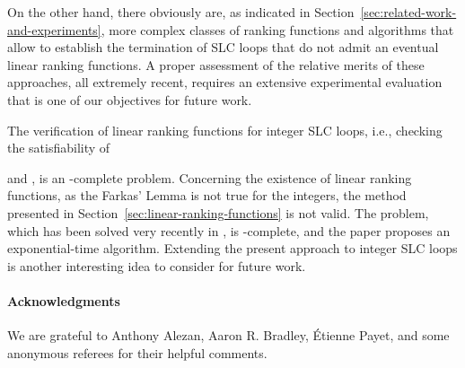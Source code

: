 \documentclass{acm_proc_article-sp}
\begin{document}
On the other hand, there obviously are, as indicated
in Section~\ref{sec:related-work-and-experiments},
more complex classes of ranking functions and algorithms that allow
to establish the termination of SLC loops that do not admit an
eventual linear ranking functions.
A proper assessment of the relative merits of these approaches,
all extremely recent, requires an extensive experimental evaluation
that is one of our objectives for future work.

The verification of linear ranking functions for integer SLC loops, i.e.,
checking the satisfiability of

and ,
is an -complete problem.
Concerning the existence of linear ranking functions,
as the Farkas' Lemma is not true for the integers,
the method presented in Section~\ref{sec:linear-ranking-functions} is not
valid.
The problem, which has been solved very recently in \cite{Ben-AmramG13},
is -complete, and the paper proposes an exponential-time algorithm.
Extending the present approach to integer SLC loops is another
interesting idea to consider for future work.

\paragraph{Acknowledgments}
We are grateful to Anthony Alezan, Aaron R. Bradley, \'Etienne Payet,
and some anonymous referees for their helpful comments.
\end{document}
